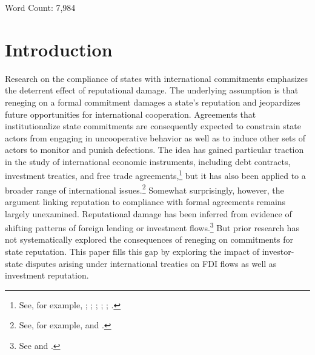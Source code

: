 \documentclass[12pt,onesided]{amsart}
\begin{document}
\vspace{10mm}

\begin{center}
Word Count: 7,984
\end{center}

\newpage

\setcounter{page}{1}
\doublespacing

\section*{Introduction}

Research on the compliance of states with international commitments emphasizes the deterrent effect of reputational damage. The underlying assumption is that reneging on a formal commitment damages a state's reputation and jeopardizes future opportunities for international cooperation. Agreements that institutionalize state commitments are consequently expected to constrain state actors from engaging in uncooperative behavior as well as to induce other sets of actors to monitor and punish defections. The idea has gained particular traction in the study of international economic instruments, including debt contracts, investment treaties, and free trade agreements,\footnote{See, for example, \citet{simmons:2000}; \citet{tomz:2007}; \citet{buthe:milner:2014}; \citet{buthe:milner:2008}; \citet{allee:peinhardt:2011}; \citet{elkins:etal:2006}.} but it has also been applied to a broader range of international issues.\footnote{See, for example, \citet{fearon:1997} and \citet{simmons:danner:2010}.} Somewhat surprisingly, however, the argument linking reputation to compliance with formal agreements remains largely unexamined. Reputational damage has been inferred from evidence of shifting patterns of foreign lending or investment flows.\footnote{See \citet{tomz:2007} and \citet{allee:peinhardt:2011}.} But prior research has not systematically explored the consequences of reneging on commitments for state reputation. This paper fills this gap by exploring the  impact of investor-state disputes arising under international treaties on FDI flows as well as investment reputation. 
\end{document}
